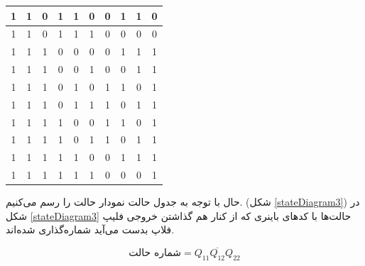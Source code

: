 \documentclass[fleqn]{article}
\begin{document}
\begin{latin}
\begin{center}
\begin{longtable}{|ccc|ccc||ccc|c|}
			1        & 1        & 0        & 1 & 1 & 0 & 0          & 1          & 1          & 0   \\ \hline
			1        & 1        & 0        & 1 & 1 & 1 & 0          & 0          & 0          & 0   \\ \hline
			1        & 1        & 1        & 0 & 0 & 0 & 0          & 1          & 1          & 1   \\ \hline
			1        & 1        & 1        & 0 & 0 & 1 & 0          & 0          & 1          & 1   \\ \hline
			1        & 1        & 1        & 0 & 1 & 0 & 1          & 1          & 0          & 1   \\ \hline
			1        & 1        & 1        & 0 & 1 & 1 & 1          & 0          & 1          & 1   \\ \hline
			1        & 1        & 1        & 1 & 0 & 0 & 1          & 1          & 0          & 1   \\ \hline
			1        & 1        & 1        & 1 & 0 & 1 & 1          & 0          & 1          & 1   \\ \hline
			1        & 1        & 1        & 1 & 1 & 0 & 0          & 1          & 1          & 1   \\ \hline
			1        & 1        & 1        & 1 & 1 & 1 & 0          & 0          & 0          & 1   \\ \hline
		\end{longtable}
	\end{center}
\end{latin}

حال با توجه به جدول حالت نمودار حالت را رسم می‌کنیم. (شکل \ref{stateDiagram3})
در شکل 
\ref{stateDiagram3}
حالت‌ها با کدهای باینری که از کنار هم گذاشتن خروجی فلیپ فلاپ بدست می‌آید شماره‌گذاری شده‌اند.

$$
\text{شماره حالت} = \overline{Q_{11} Q_{12} Q_{22}}
$$
\end{document}
